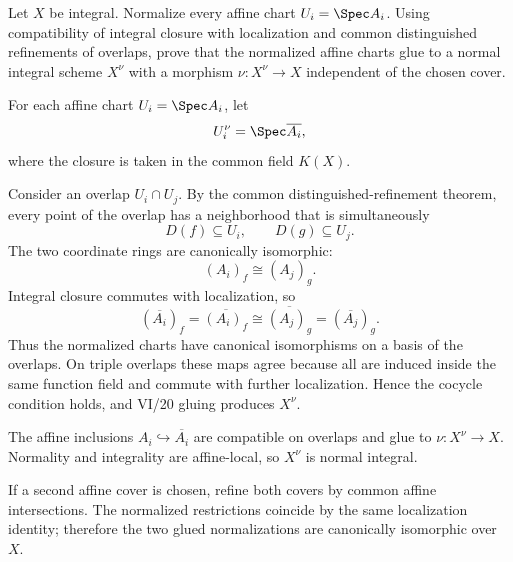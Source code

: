 \begin{problem}\label{prob:vi28-02}
Let \(X\) be integral. Normalize every affine chart \(U_i=\Spec A_i\). Using compatibility of integral closure with localization and common distinguished refinements of overlaps, prove that the normalized affine charts glue to a normal integral scheme \(X^\nu\) with a morphism \(\nu:X^\nu\to X\) independent of the chosen cover.

\end{problem}

\ifdefined\FullProblemDossiers
\begin{solution}
For each affine chart \(U_i=\Spec A_i\), let
\[
U_i^\nu=\Spec\overline{A_i},
\]
where the closure is taken in the common field \(K(X)\).

Consider an overlap \(U_i\cap U_j\). By the common distinguished-refinement theorem, every point of the overlap has a neighborhood that is simultaneously
\[
D(f)\subseteq U_i,\qquad D(g)\subseteq U_j.
\]
The two coordinate rings are canonically isomorphic:
\[
(A_i)_f\cong(A_j)_g.
\]
Integral closure commutes with localization, so
\[
(\overline{A_i})_f
=
\overline{(A_i)_f}
\cong
\overline{(A_j)_g}
=
(\overline{A_j})_g.
\]
Thus the normalized charts have canonical isomorphisms on a basis of the overlaps. On triple overlaps these maps agree because all are induced inside the same function field and commute with further localization. Hence the cocycle condition holds, and VI/20 gluing produces \(X^\nu\).

The affine inclusions \(A_i\hookrightarrow\overline{A_i}\) are compatible on overlaps and glue to \(\nu:X^\nu\to X\). Normality and integrality are affine-local, so \(X^\nu\) is normal integral.

If a second affine cover is chosen, refine both covers by common affine intersections. The normalized restrictions coincide by the same localization identity; therefore the two glued normalizations are canonically isomorphic over \(X\).
\end{solution}
\fi
